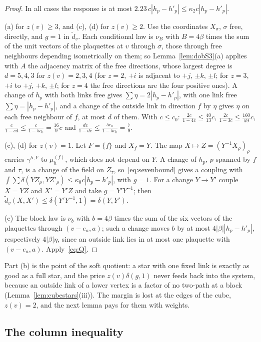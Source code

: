 \begin{proof}
In all cases the response is at most $2.23\,c|h_p-h'_p|\le\kappa_2c|h_p-h'_p|$.

(a) for $z(v)\ge3$, and (c), (d) for $z(v)\ge2$. Use the coordinates
$X_\sigma$, $\sigma$ free, directly, and $g=1$ in $\tilde d_v$. Each conditional
law is $\nu_B$ with $B=4\beta$ times the sum of the unit vectors of the
plaquettes at $v$ through $\sigma$, those through free neighbours depending
isometrically on them; so Lemma~\ref{lem:dobS3}(a) applies with $A$ the
adjacency matrix of the free directions, whose largest degree is $d=5,4,3$
for $z(v)=2,3,4$ (for $z=2$, $+i$ is adjacent to $+j$, $\pm k$, $\pm l$; for
$z=3$, $+i$ to $+j$, $+k$, $\pm l$; for $z=4$ the free directions are the four
positive ones). A change of $h_p$ with both links free gives $\sum\eta=
2|h_p-h'_p|$, with one link free $\sum\eta=|h_p-h'_p|$, and a change of the
outside link in direction $f$ by $\eta$ gives $\eta$ on each free neighbour of
$f$, at most $d$ of them. With $c\le c_0$: $\frac{2c}{1-4c}\le\frac{40}{13}c$,
$\frac{2c}{1-3c}\le\frac{160}{59}c$, $\frac c{1-cd}\le\frac c{1-5c_0}=
\frac{16}9c$ and $\frac{dc}{1-dc}\le\frac{5c_0}{1-5c_0}=\frac79$.

(c), (d) for $z(v)=1$. Let $F=\{f\}$ and $X_f=Y$. The map $X\mapsto Z=(Y^{-1}
X_\rho)_\rho$ carries $\gamma^{h,Y}$ to $\mu^{(f)}_h$, which does not depend on
$Y$. A change of $h_p$, $p$ spanned by $f$ and $\tau$, is a change of the
field on $Z_\tau$, so~\eqref{eq:sevenbound} gives a coupling with
$\int\sum\delta(YZ_\rho,YZ'_\rho)\le\kappa_0c|h_p-h'_p|$, with $g=1$. For a
change $Y\to Y'$ couple $X=YZ$ and $X'=Y'Z$ and take $g=Y'Y^{-1}$; then
$\tilde d_v(X,X')\le\delta(Y'Y^{-1},1)=\delta(Y,Y')$.

(e) The block law is $\nu_b$ with $b=4\beta$ times the sum of the six vectors
of the plaquettes through $(v-e_a,a)$; such a change moves $b$ by at most
$4|\beta||h_p-h'_p|$, respectively $4|\beta|\eta$, since an outside link lies
in at most one plaquette with $(v-e_a,a)$. Apply~\eqref{eq:Q}.
\end{proof}

Part (b) is the point of the soft quotient: a star with one fixed link is
exactly as good as a full star, and the price $z(v)\delta(g,1)$ never feeds
back into the system, because an outside link of a lower vertex is a factor
of no two-path at a block (Lemma~\ref{lem:cubestars}(iii)). The margin is lost
at the edges of the cube, $z(v)=2$, and the next lemma pays for them with
weights.

\subsection{The column inequality}

